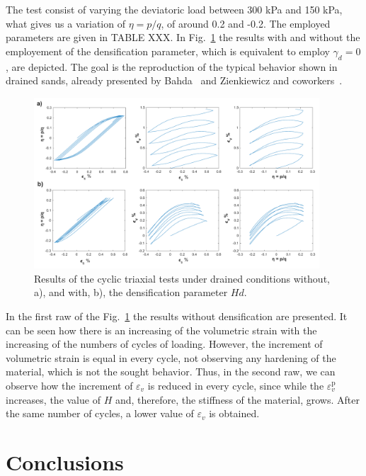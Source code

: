 \documentclass[preprint,12pt,a4paper]{elsarticle}
\begin{document}
The test consist of varying the deviatoric load between 300 kPa and 150 kPa, what gives us a variation of $\eta=p/q$, of around 0.2 and -0.2. The employed parameters are given in TABLE XXX. In Fig.~\ref{fig_c_drained} the results with and without the employement of the densification parameter, which is equivalent to employ $\gamma_{d}=0$, are depicted. The goal is the reproduction of the typical behavior shown in drained sands, already presented by Bahda~\cite{bahda1997} and Zienkiewicz and coworkers~\cite{Zienkiewicz99}. 

\begin{figure}
\centering
\includegraphics[width=0.95\textwidth]{Figs/ciclo_drained.pdf}
\caption{Results of the cyclic triaxial tests under drained conditions without, a), and with, b), the densification parameter $Hd$.}
\label{fig_c_drained}
\end{figure}

In the first raw of the Fig.~\ref{fig_c_drained} the results without densification are presented. It can be seen how there is an increasing of the volumetric strain with the increasing of the numbers of cycles of loading. However, the increment of volumetric strain is equal in every cycle, not observing any hardening of the material, which is not the sought behavior. Thus, in the second raw, we can observe how the increment of $\varepsilon_{v}$ is reduced in every cycle, since while the $\varepsilon_{v}^{\mathrm{p}}$ increases, the value of $H$ and, therefore, the stiffness of the material, grows. After the same number of cycles, a lower value of $\varepsilon_{v}$ is obtained.


\section{Conclusions}
\label{sec:5}
\end{document}
